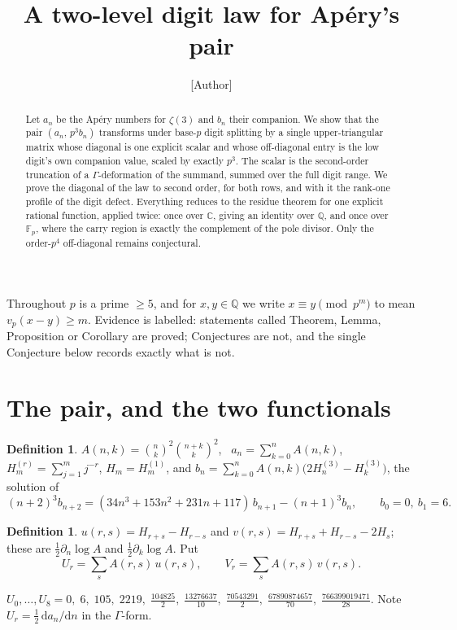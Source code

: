 \documentclass[11pt,a4paper]{amsart}
\title{A two-level digit law for Ap\'ery's pair}
\author{[Author]}
\date{}
\theoremstyle{plain}
\theoremstyle{definition}
\newtheorem{definition}[theorem]{Definition}
\theoremstyle{remark}
\newcommand{\QQ}{\mathbb{Q}}
\newcommand{\FF}{\mathbb{F}}
\newcommand{\CC}{\mathbb{C}}
\newcommand{\vp}{v_p}
\newcommand{\A}{A}
\begin{document}
\begin{abstract}
Let $a_n$ be the Ap\'ery numbers for $\zeta(3)$ and $b_n$ their companion. We show that
the pair $(a_n,\,p^3b_n)$ transforms under base-$p$ digit splitting by a single
upper-triangular matrix whose diagonal is one explicit scalar and whose off-diagonal
entry is the low digit's own companion value, scaled by exactly $p^{3}$. The scalar is
the second-order truncation of a $\Gamma$-deformation of the summand, summed over the
full digit range. We prove the diagonal of the law to second order, for both rows, and
with it the rank-one profile of the digit defect. Everything reduces to the residue
theorem for one explicit rational function, applied twice: once over $\CC$, giving an
identity over $\QQ$, and once over $\FF_p$, where the carry region is exactly the
complement of the pole divisor. Only the order-$p^4$ off-diagonal remains conjectural.
\end{abstract}
\maketitle

Throughout $p$ is a prime $\ge5$, and for $x,y\in\QQ$ we write $x\equiv y\pmod{p^m}$ to
mean $\vp(x-y)\ge m$. Evidence is labelled: statements called Theorem, Lemma,
Proposition or Corollary are proved; Conjectures are not, and the single Conjecture
below records exactly what is not.

\section{The pair, and the two functionals}

\begin{definition}
$\A(n,k)=\binom nk^2\binom{n+k}k^2$, \ $a_n=\sum_{k=0}^n \A(n,k)$, \ $H^{(r)}_m=\sum_{j=1}^m j^{-r}$,
$H_m=H^{(1)}_m$, and $b_n=\sum_{k=0}^n \A(n,k)\bigl(2H^{(3)}_n-H^{(3)}_k\bigr)$, the solution of
\[
  (n+2)^3b_{n+2}=(34n^3+153n^2+231n+117)\,b_{n+1}-(n+1)^3b_n,\qquad b_0=0,\ b_1=6 .
\]
\end{definition}

\begin{definition}\label{def:uv}
$u(r,s)=H_{r+s}-H_{r-s}$ and $v(r,s)=H_{r+s}+H_{r-s}-2H_s$; these are
$\tfrac12\partial_n\log \A$ and $\tfrac12\partial_k\log \A$. Put
\[
  U_r=\sum_{s} \A(r,s)\,u(r,s),\qquad V_r=\sum_{s} \A(r,s)\,v(r,s).
\]
\end{definition}

$U_0,\dots,U_8=0,\;6,\;105,\;2219,\;\tfrac{104825}2,\;\tfrac{13276637}{10},\;
\tfrac{70543291}2,\;\tfrac{67890874657}{70},\;\tfrac{766399019471}{28}$.
Note $U_r=\tfrac12\,\mathrm{d}a_n/\mathrm{d}n$ in the $\Gamma$-form.
\end{document}
